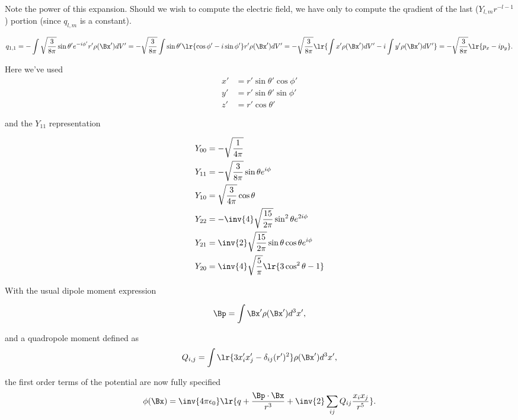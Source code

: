 Note the power of this expansion.  Should we wish to compute the electric field, we have only to compute the qradient of  the last (\(Y_{l,m} r^{-l-1} \)) portion (since \( q_{l,m} \) is a constant).
 
\begin{dmath}\label{eqn:emtLecture8:520}
q_{1,1}
= 
-\int \sqrt{\frac{3}{8 \pi}} \sin\theta' e^{-i\phi'} r' \rho(\Bx') dV'
=
-\sqrt{\frac{3}{8 \pi}} \int \sin\theta' \lr{ \cos\phi' - i\sin\phi'} r' \rho(\Bx') dV'
=
-\sqrt{\frac{3}{8 \pi}} \lr{ 
\int x' \rho(\Bx') dV'
-i \int y' \rho(\Bx') dV'
}
=
-\sqrt{\frac{3}{8 \pi}} \lr{ 
p_x - i p_y
}.
\end{dmath}

Here we've used
\begin{dmath}\label{eqn:emtLecture8:540}
\begin{aligned}
x' &= r' \sin\theta' \cos\phi' \\
y' &= r' \sin\theta' \sin\phi' \\
z' &= r' \cos\theta'
\end{aligned}
\end{dmath}

and the \( Y_{11} \) representation

\begin{dmath}\label{eqn:emtLecture8:560}
\begin{aligned}
Y_{00} &= -\sqrt{\frac{1}{4 \pi}} \\
Y_{11} &= -\sqrt{\frac{3}{8 \pi}} \sin\theta e^{i\phi} \\
Y_{10} &=  \sqrt{\frac{3}{4 \pi}} \cos\theta  \\
Y_{22} &= -\inv{4} \sqrt{\frac{15}{2 \pi}} \sin^2\theta e^{2 i\phi} \\
Y_{21} &=  \inv{2} \sqrt{\frac{15}{2 \pi}} \sin\theta \cos\theta e^{i\phi} \\
Y_{20} &=  \inv{4} \sqrt{\frac{5}{\pi}} \lr{ 3 \cos^2\theta - 1 } \\
\end{aligned}
\end{dmath}


With the usual dipole moment expression

\begin{dmath}\label{eqn:emtLecture8:580}
\Bp = \int \Bx' \rho(\Bx') d^3 x',
\end{dmath}

and a quadropole moment defined as
\begin{dmath}\label{eqn:emtLecture8:600}
Q_{i,j} = \int \lr{ 3 x_i' x_j' - \delta_{ij} (r')^2 } \rho(\Bx') d^3 x',
\end{dmath}

the first order terms of the potential are now fully specified
\begin{dmath}\label{eqn:emtLecture8:620}
\phi(\Bx)
=
\inv{4 \pi \epsilon_0}
\lr{ 
q + \frac{\Bp \cdot \Bx}{r^3} + 
\inv{2} \sum_{ij} Q_{ij} \frac{x_i x_j}{r^5}
}.
\end{dmath}
